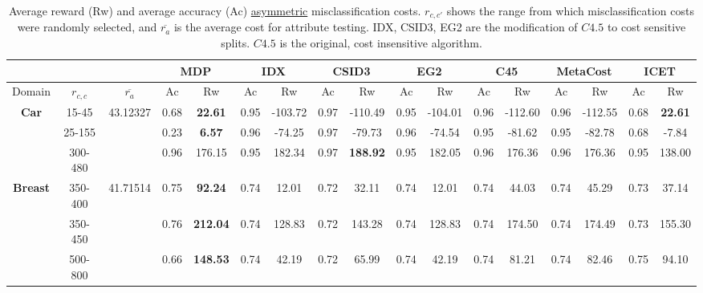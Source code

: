 \documentclass[letterpaper]{article}
\theoremstyle{definition}
\begin{document}
\begin{table}[t]
\centering
\scriptsize
\caption{Average reward (Rw) and average accuracy (Ac) \underline{asymmetric} misclassification costs. $r_{c,c'}$ shows the range from which misclassification costs were randomly selected, and $\overline{r_a}$ is the average cost for attribute testing. IDX, CSID3, EG2 are the modification of $C4.5$ to cost sensitive splits. $C4.5$ is the original, cost insensitive algorithm.}
\label{tbl:asymmetric}
\begin{tabular}{|c|c|c|c|c|c|c|c|c|c|c|c|c|c|c|c|c|}
\hline
	&&& \multicolumn{2}{c|}{MDP}     & \multicolumn{2}{c|}{IDX} & \multicolumn{2}{c|}{CSID3}   & \multicolumn{2}{c|}{EG2} & \multicolumn{2}{c|}{C45}    & \multicolumn{2}{c|}{MetaCost} & \multicolumn{2}{c|}{ICET}    \\ \hline
Domain&$r_{c,c}$&$\overline{r_a}$&Ac&Rw&Ac&Rw&Ac&Rw&Ac&Rw&Ac&Rw&Ac&Rw&Ac&Rw \\ \hline

\multirow{3}{*}{\textbf{Car}}       & 15-45     & 43.12327  & 0.68  & \textbf{22.61}   & 0.95      & -103.72      & 0.97   & -110.49           & 0.95      & -104.01      & 0.96      & -112.60      & 0.96         & -112.55        & 0.68   & \textbf{22.61}   \\ \cline{2-17}
                                    & 25-155    &           & 0.23  & \textbf{6.57}    & 0.96      & -74.25       & 0.97   & -79.73            & 0.96      & -74.54       & 0.95      & -81.62       & 0.95         & -82.78         & 0.68   & -7.84            \\ \cline{2-17}
                                    & 300-480   &           & 0.96  & 176.15           & 0.95      & 182.34       & 0.97   & \textbf{188.92}   & 0.95      & 182.05       & 0.96      & 176.36       & 0.96         & 176.36         & 0.95   & 138.00           \\ \hline
\multirow{3}{*}{\textbf{Breast}}    & 350-400   & 41.71514  & 0.75  & \textbf{92.24}   & 0.74      & 12.01        & 0.72   & 32.11             & 0.74      & 12.01        & 0.74      & 44.03        & 0.74         & 45.29          & 0.73   & 37.14            \\ \cline{2-17}
                                    & 350-450   &           & 0.76  & \textbf{212.04}  & 0.74      & 128.83       & 0.72   & 143.28            & 0.74      & 128.83       & 0.74      & 174.50       & 0.74         & 174.49         & 0.73   & 155.30           \\ \cline{2-17}
                                    & 500-800   &           & 0.66  & \textbf{148.53}  & 0.74      & 42.19        & 0.72   & 65.99             & 0.74      & 42.19        & 0.74      & 81.21        & 0.74         & 82.46          & 0.75   & 94.10            \\ \hline


\end{tabular}
\end{table}
\end{document}
